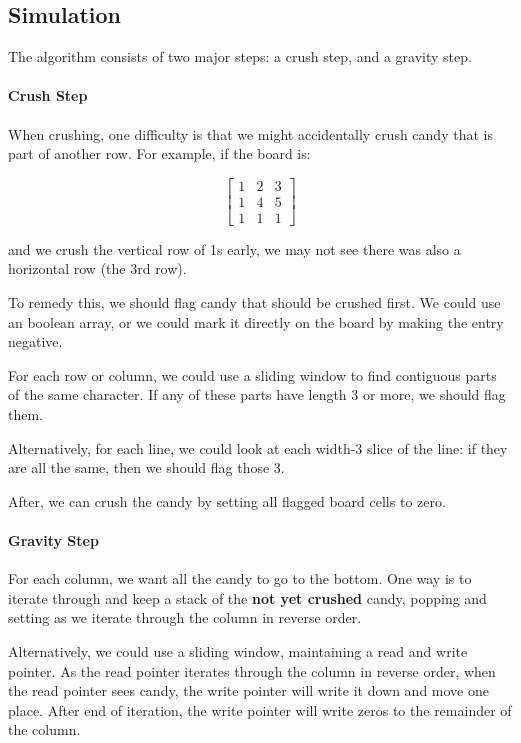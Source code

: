 \subsection{Simulation}
The algorithm consists of two major steps: a crush step, and a gravity step. 

\paragraph{Crush Step}
When crushing, one difficulty is that we might accidentally crush candy that is part of another row. For example, if the board is:

\[
\begin{bmatrix}
1 & 2 & 3\\
1 & 4 & 5\\
1 & 1 & 1
\end{bmatrix}
\]

and we crush the vertical row of 1s early, we may not see there was also a horizontal row (the 3rd row).

To remedy this, we should flag candy that should be crushed first. We could use an boolean array, or we could mark it directly on the board by making the entry negative. 

For each row or column, we could use a sliding window to find contiguous parts of the same character. If any of these parts have length 3 or more, we should flag them.

Alternatively, for each line, we could look at each width-3 slice of the line: if they are all the same, then we should flag those 3.

After, we can crush the candy by setting all flagged board cells to zero.

\paragraph{Gravity Step}
For each column, we want all the candy to go to the bottom. One way is to iterate through and keep a stack of the \textbf{not yet crushed} candy, popping and setting as we iterate through the column in reverse order.

Alternatively, we could use a sliding window, maintaining a read and write pointer. As the read pointer iterates through the column in reverse order, when the read pointer sees candy, the write pointer will write it down and move one place. After end of iteration, the write pointer will write zeros to the remainder of the column.


